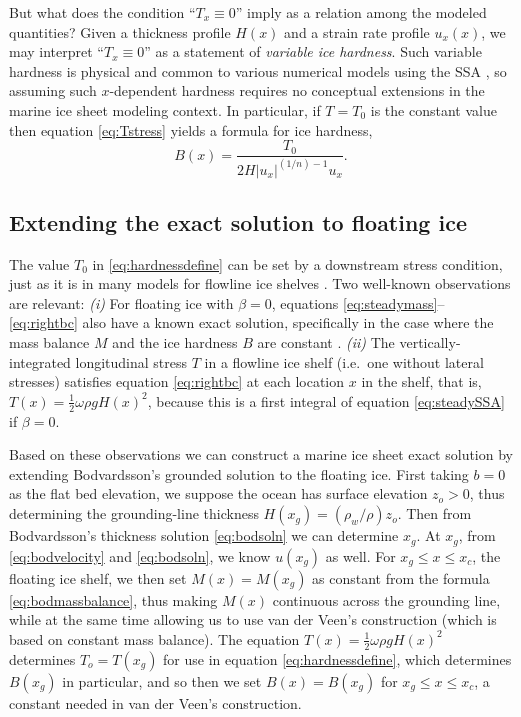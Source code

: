 \documentclass[review,letterpaper]{igs}
\begin{document}
But what does the condition ``$T_x\equiv 0$'' imply as a relation among the modeled quantities?  Given a thickness profile $H(x)$ and a strain rate profile $u_x(x)$, we may interpret ``$T_x\equiv 0$'' as a statement of \emph{variable ice hardness}.  Such variable hardness is physical and common to various numerical models using the SSA \citep[for example]{BBssasliding}, so assuming such $x$-dependent hardness requires no conceptual extensions in the marine ice sheet modeling context.  In particular, if $T=T_0$ is the constant value then equation \eqref{eq:Tstress} yields a formula for ice hardness,
\begin{equation}
B(x) = \frac{T_0}{2 H |u_x|^{(1/n)-1} u_x}. \label{eq:hardnessdefine}
\end{equation}


\subsection*{Extending the exact solution to floating ice}  The value $T_0$ in \eqref{eq:hardnessdefine} can be set by a downstream stress condition, just as it is in many models for flowline ice shelves \citep[e.g.][]{MISMIP2012,SchoofMarine1}.  Two well-known observations are relevant:  \emph{(i)}  For floating ice with $\beta=0$, equations \eqref{eq:steadymass}--\eqref{eq:rightbc} also have a known exact solution, specifically in the case where the mass balance $M$ and the ice hardness $B$ are constant \citep{vanderVeen83,vanderVeen}.  \emph{(ii)}  The vertically-integrated longitudinal stress $T$ in a flowline ice shelf (i.e.~one without lateral stresses) satisfies equation \eqref{eq:rightbc} at each location $x$ in the shelf, that is, $T(x) = \frac{1}{2} \omega \rho g H(x)^2$, because this is a first integral of equation \eqref{eq:steadySSA} if $\beta=0$.

Based on these observations we can construct a marine ice sheet exact solution by extending Bodvardsson's grounded solution to the floating ice.  First taking $b=0$ as the flat bed elevation, we suppose the ocean has surface elevation $z_o>0$, thus determining the grounding-line thickness $H(x_g) = (\rho_w/\rho) z_o$.  Then from Bodvardsson's thickness solution \eqref{eq:bodsoln} we can determine $x_g$.  At $x_g$, from \eqref{eq:bodvelocity} and \eqref{eq:bodsoln}, we know $u(x_g)$ as well.  For $x_g \le x \le x_c$, the floating ice shelf, we then set $M(x) = M(x_g)$ as constant from the formula \eqref{eq:bodmassbalance}, thus making $M(x)$ continuous across the grounding line, while at the same time allowing us to use van der Veen's construction (which is based on constant mass balance).  The equation $T(x) = \frac{1}{2} \omega \rho g H(x)^2$ determines $T_o=T(x_g)$ for use in equation \eqref{eq:hardnessdefine}, which determines $B(x_g)$ in particular, and so then we set $B(x)=B(x_g)$ for $x_g \le x \le x_c$, a constant needed in van der Veen's construction.
\end{document}
